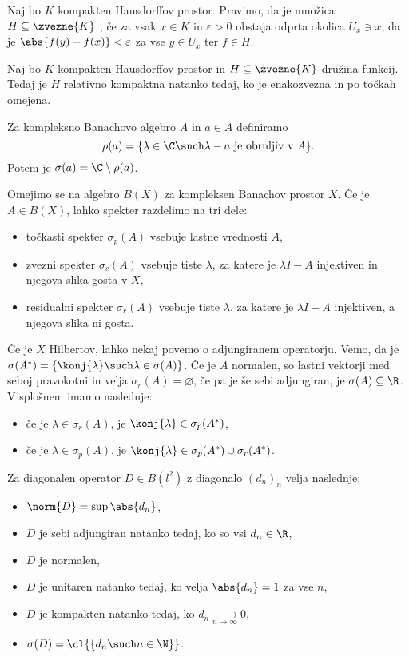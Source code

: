 Naj bo $K$ kompakten Hausdorffov prostor.
Pravimo, da je množica $H \subseteq \zvezne{K}$ , če za vsak
$x \in K$ in $\varepsilon > 0$ obstaja odprta okolica $U_x \ni x$, da je
$\abs{f(y) - f(x)} < \varepsilon$ za vse $y \in U_x$ ter $f \in H$.

\begin{izrek}
  Naj bo $K$ kompakten Hausdorffov prostor in $H \subseteq \zvezne{K}$ družina
  funkcij.
  Tedaj je $H$ relativno kompaktna natanko tedaj, ko je enakozvezna in po točkah
  omejena.
\end{izrek}


Za kompleksno Banachovo algebro $A$ in $a \in A$ definiramo 
\[
  \rho(a) = \{ \lambda \in \C \such \text{$\lambda - a$ je obrnljiv v $A$} \}.
\]
Potem je  $\sigma(a) = \C \setminus \rho(a)$.

Omejimo se na algebro $B(X)$ za kompleksen Banachov prostor $X$.
Če je $A \in B(X)$, lahko spekter razdelimo na tri dele:
\begin{itemize}
\item točkasti spekter $\sigma_p(A)$ vsebuje lastne vrednosti $A$,
\item zvezni spekter $\sigma_c(A)$ vsebuje tiste $\lambda$, za katere je
  $\lambda I - A$ injektiven in njegova slika gosta v $X$,
\item residualni spekter $\sigma_r(A)$ vsebuje tiste $\lambda$, za katere je
  $\lambda I - A$ injektiven, a njegova slika ni gosta.
\end{itemize}

Če je $X$ Hilbertov, lahko nekaj povemo o adjungiranem operatorju.
Vemo, da je $\sigma(A^*) = \{ \konj{\lambda} \such \lambda \in \sigma(A) \}$.
Če je $A$ normalen, so lastni vektorji med seboj pravokotni in velja
$\sigma_r(A) = \varnothing$, če pa je še sebi adjungiran, je $\sigma(A)
\subseteq \R$.
V splošnem imamo naslednje:
\begin{itemize}
\item če je $\lambda \in \sigma_r(A)$, je $\konj{\lambda} \in \sigma_p(A^*)$,
\item če je $\lambda \in \sigma_p(A)$, je $\konj{\lambda} \in \sigma_p(A^*) \cup
  \sigma_r(A^*)$.
\end{itemize}

Za diagonalen operator $D \in B(l^2)$ z diagonalo $(d_n)_n$ velja naslednje:
\begin{itemize}
\item $\norm{D} = \sup \abs{d_n}$,
\item $D$ je sebi adjungiran natanko tedaj, ko so vsi $d_n \in \R$,
\item $D$ je normalen,
\item $D$ je unitaren natanko tedaj, ko velja $\abs{d_n} = 1$ za vse $n$,
\item $D$ je kompakten natanko tedaj, ko $d_n \xrightarrow[n \to \infty]{} 0$,
\item $\sigma(D) = \cl{\{ d_n \such n \in \N \}}$.
\end{itemize}

